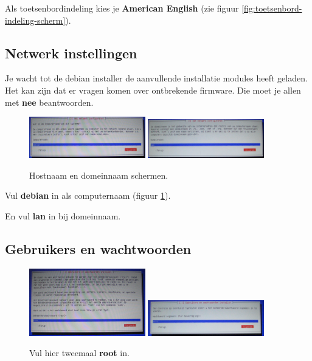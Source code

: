 \documentclass[12pt,a4paper]{article}
\begin{document}
Als toetsenbordindeling kies je \textbf{American English} (zie figuur \ref{fig:toetsenbord-indeling-scherm}).


\subsection{Netwerk instellingen}
Je wacht tot de debian installer de aanvullende installatie modules heeft geladen. Het kan zijn dat er vragen komen over ontbrekende firmware. Die moet je allen met \textbf{nee} beantwoorden.

\begin{figure}[H]
\centering
\includegraphics[width=0.45\textwidth]{computernaam-scherm}
\includegraphics[width=0.45\textwidth]{domeinnaam-scherm}
\caption{Hostnaam en domeinnaam schermen.}
\label{fig:computernaam-scherm}
\end{figure}

Vul \textbf{debian} in als computernaam (figuur \ref{fig:computernaam-scherm}).

En vul \textbf{lan} in bij domeinnaam.


\subsection{Gebruikers en wachtwoorden}

\begin{figure}[H]
\centering
\includegraphics[width=0.45\textwidth]{root-wachtwoord-scherm}
\includegraphics[width=0.45\textwidth]{root-wachtwoord-bevestiging}
\caption{Vul hier tweemaal \textbf{root} in.}
\label{fig:root-wachtwoord-scherm}
\end{figure}
\end{document}
